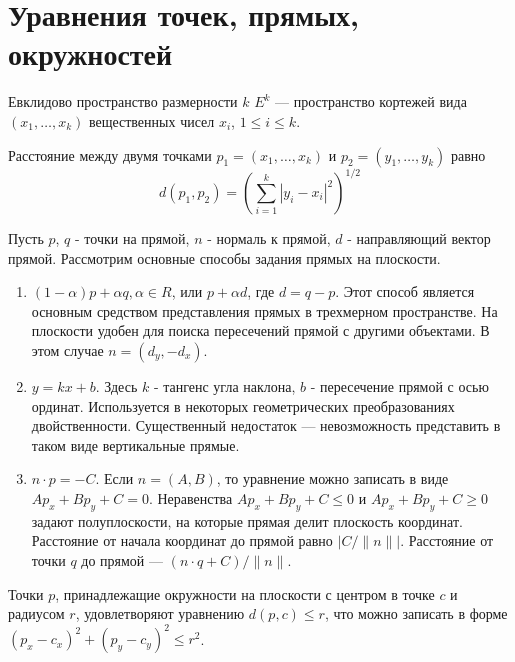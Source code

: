 


\section{Уравнения точек, прямых, окружностей}
\begin{define}
  Евклидово пространство размерности $k$ $E^k$ --- пространство
  кортежей вида $(x_1, \ldots, x_k)$ вещественных чисел $x_i$, $1 \le
  i \le k$.
\end{define}

Расстояние между двумя точками $p_1 = (x_1, \ldots, x_k)$ и $p_2 =
(y_1, \ldots, y_k)$ равно $$d(p_1, p_2) = \left(\sum_{i=1}^k|y_i -
x_i|^2\right)^{1/2}$$

Пусть $p$, $q$ - точки на прямой, $n$ - нормаль к прямой, $d$ -
направляющий вектор прямой.
Рассмотрим основные способы задания прямых на плоскости.
\begin{enumerate}
\item $(1 - \alpha) p + \alpha q, \alpha \in R$, или $p + \alpha d$,
  где $d = q - p$. Этот способ является
  основным средством представления прямых в трехмерном пространстве.
  На плоскости удобен для поиска пересечений прямой с другими
  объектами. В этом случае $n = (d_y, -d_x)$.
\item $y = kx + b$. Здесь $k$ - тангенс угла наклона, $b$ -
  пересечение прямой с осью ординат. Используется в некоторых
  геометрических преобразованиях двойственности. Существенный
  недостаток --- невозможность представить в таком виде вертикальные
  прямые.
\item $n \cdot p = -C$. Если $n=(A, B)$, то уравнение можно записать в
  виде $Ap_x + Bp_y + C=0$. Неравенства $Ap_x + Bp_y + C \le 0$ и
  $Ap_x + Bp_y + C \ge 0$ задают полуплоскости, на которые прямая
  делит плоскость координат. Расстояние от начала координат до прямой
  равно $|C / \|n\||$. Расстояние от точки $q$ до прямой --- $(n \cdot
  q + C) / \|n\|$.
\end{enumerate}

Точки $p$, принадлежащие окружности на плоскости с центром в точке
$c$ и радиусом $r$, удовлетворяют уравнению $d(p, c) \le r$, что можно
записать в форме $(p_x - c_x)^2 + (p_y - c_y)^2 \le r^2$.

